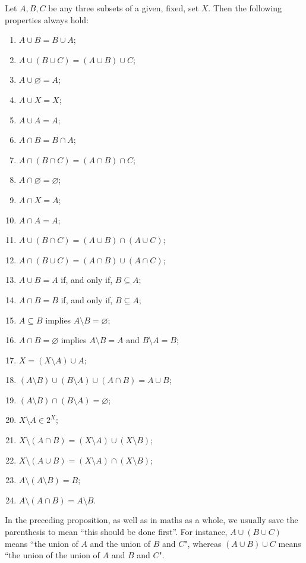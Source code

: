 \begin{prop}
	Let $A,B,C$ be any three subsets of a given, fixed, set $X$. Then the following properties always hold:
	\begin{multicols}{2}
		\begin{enumerate}[(1)]
			\item $A\cup B=B\cup A$;
			\item $A\cup(B\cup C)=(A\cup B)\cup C$;
			\item $A\cup\varnothing = A$;
			\item $A\cup X=X$;
			\item $A\cup A=A$;
			\item $A\cap B=B\cap A$;
			\item $A\cap(B\cap C)=(A\cap B)\cap C$;
			\item $A\cap\varnothing=\varnothing$;
			\item $A\cap X=A$;
			\item $A\cap A=A$;
			\item $A\cup(B\cap C)=(A\cup B)\cap(A\cup C)$;
			\item $A\cap(B\cup C)=(A\cap B)\cup(A\cap C)$;
			\item $A\cup B=A$ if, and only if, $B\subseteq A$;
			\item $A\cap B=B$ if, and only if, $B\subseteq A$;
			\item $A\subseteq B$ implies $A\setminus B=\varnothing$;
			\item $A\cap B=\varnothing$ implies $A\setminus B=A$ and $B\setminus A=B$;
			\item $X=(X\setminus A)\cup A$;
			\item $(A\setminus B)\cup(B\setminus A)\cup(A\cap B)=A\cup B$;		
			\item $(A\setminus B)\cap(B\setminus A)=\varnothing$;
			\item $X\setminus A\in 2^X$;
			\item $X\setminus (A\cap B)=(X\setminus A)\cup(X\setminus B)$;
			\item $X\setminus (A\cup B)=(X\setminus A)\cap(X\setminus B)$;			
			\item $A\setminus(A\setminus B)=B$;
			\item $A\setminus(A\cap B)=A\setminus B$.
		\end{enumerate}%
	\end{multicols}%
\end{prop}

\begin{rmk}
	In the preceding proposition, as well as in maths as a whole, we usually save the parenthesis to mean ``this should be done first''. For instance, $A\cup(B\cup C)$ means ``the union of $A$ and the union of $B$ and $C$", whereas $(A\cup B)\cup C$ means ``the union of the union of $A$ and $B$ and $C$".
\end{rmk}
\newpage
